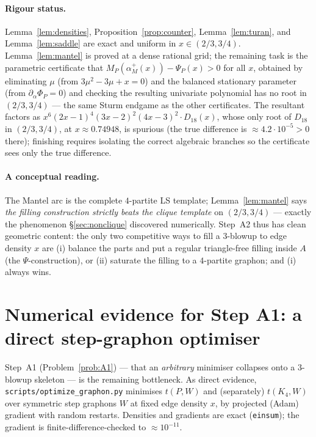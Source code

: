 \documentclass[11pt]{amsart}
\theoremstyle{definition}
\newcommand{\1}{\mathbf 1}
\begin{document}
\paragraph{Rigour status.}  Lemma~\ref{lem:densities}, Proposition~\ref{prop:counter},
Lemma~\ref{lem:turan}, and Lemma~\ref{lem:saddle} are exact and uniform in
$x\in(2/3,3/4)$.  Lemma~\ref{lem:mantel} is proved at a dense rational grid; the
remaining task is the parametric certificate that
$M_P(\alpha_M^{+}(x))-\Psi_P(x)>0$ for all $x$, obtained by eliminating $\mu$
(from $3\mu^2-3\mu+x=0$) and the balanced stationary parameter (from
$\partial_\alpha\Phi_P=0$) and checking the resulting univariate polynomial has
no root in $(2/3,3/4)$ --- the same Sturm endgame as the other certificates.  The
resultant factors as $x^6(2x-1)^4(3x-2)^2(4x-3)^2\cdot D_{18}(x)$, whose only root
of $D_{18}$ in $(2/3,3/4)$, at $x\approx0.74948$, is spurious (the true difference
is $\approx4.2\cdot10^{-5}>0$ there); finishing requires isolating the correct
algebraic branches so the certificate sees only the true difference.

\paragraph{A conceptual reading.}  The Mantel arc is the complete $4$-partite LS
template; Lemma~\ref{lem:mantel} says \emph{the filling construction strictly
beats the clique template} on $(2/3,3/4)$ --- exactly the phenomenon
\S\ref{sec:nonclique} discovered numerically.  Step~A2 thus has clean geometric
content: the only two competitive ways to fill a $3$-blowup to edge density $x$
are (i) balance the parts and put a regular triangle-free filling inside $A$ (the
$\Psi$-construction), or (ii) saturate the filling to a $4$-partite graphon; and
(i) always wins.

\section{Numerical evidence for Step A1: a direct step-graphon optimiser}
\label{sec:numerics}

Step~A1 (Problem~\ref{prob:A1}) --- that an \emph{arbitrary} minimiser collapses
onto a $3$-blowup skeleton --- is the remaining bottleneck.  As direct evidence,
\texttt{scripts/optimize\_graphon.py} minimises $t(P,W)$ and (separately)
$t(K_4,W)$ over symmetric step graphons $W$ at fixed edge density $x$, by
projected (Adam) gradient with random restarts.  Densities and gradients are
exact (\texttt{einsum}); the gradient is finite-difference-checked to
$\approx10^{-11}$.
\end{document}
